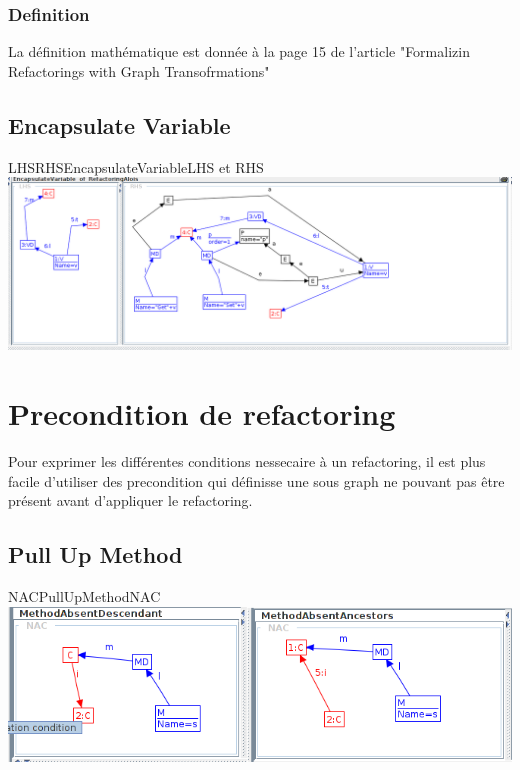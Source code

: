 \documentclass[a4paper, 10pt]{article}
\begin{document}
\subsubsection{Definition}

La définition mathématique est donnée à la page 15 de l'article "Formalizin Refactorings with Graph Transofrmations"


\subsection{Encapsulate Variable}


\begin{myfig}{LHSRHSEncapsulateVariable}{LHS et RHS}
\includegraphics[width=\textwidth]{LHSRHSEncapsulateVariable.png}
\end{myfig}

\section{Precondition de refactoring}
Pour exprimer les différentes conditions nessecaire à un refactoring, il est plus facile d'utiliser des precondition qui définisse une sous graph ne pouvant pas être présent avant d'appliquer le refactoring.

\subsection{Pull Up Method}

\begin{myfig}{NACPullUpMethod}{NAC}
\includegraphics[width=\textwidth]{NACPullUpMethod.png}
\end{myfig}
\end{document}
